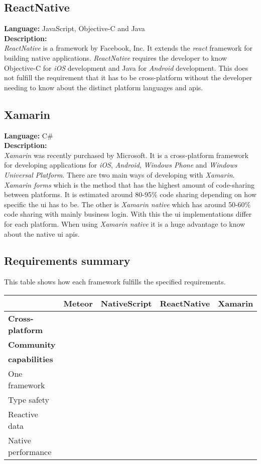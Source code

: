 \subsection*{ReactNative}
\textbf{Language:} JavaScript, Objective-C and Java
\\
\textbf{Description:}
\\
\textit{ReactNative} is a framework by Facebook, Inc.
It extends the \textit{\gls{react}} framework for building native applications. 
\textit{ReactNative} requires the developer to know Objective-C for \textit{iOS} development and Java for \textit{Android} development. 
This does not fulfill the requirement that it has to be cross-platform without the developer needing to know about the distinct platform languages and \glspl{api}.


\subsection*{Xamarin}
\textbf{Language:} C\#
\\
\textbf{Description:}
\\ 
\textit{Xamarin} was recently purchased by Microsoft. It is a cross-platform framework for developing applications for \textit{iOS}, \textit{Android}, \textit{Windows Phone} and \textit{Windows Universal Platform}. 
There are two main ways of developing with \textit{Xamarin}. 
\textit{Xamarin forms} which is the method that has the highest amount of code-sharing between platforms. 
It is estimated around 80-95\% code sharing depending on how specific the \gls{ui} has to be. 
The other is \textit{Xamarin native} which has around 50-60\% code sharing with mainly business login.
With this the \gls{ui} implementations differ for each platform. 
When using \textit{Xamarin native} it is a huge advantage to know about the native \gls{ui} \glspl{api}.

\subsection*{Requirements summary}
This table shows how each framework fulfills the specified requirements.

\begin{tabularx}{\textwidth}{|l|C C C C|}
	\hline 
	& Meteor & NativeScript & ReactNative & Xamarin \\ 
	\hline 
	\textbf{Cross-platform} & \cmark & \cmark & \cmark & \cmark \\ 
	\hline 
	\textbf{Community} & \cmark & \cmark & \cmark & \cmark \\ 
	\hline 
	\textbf{ capabilities} & \cmark & \cmark & \cmark & \cmark \\ 
	\hline 
	One framework & \cmark & \cmark & \xmark & \xmark \\ 
	\hline 
	Type safety & \xmark & \cmark & \xmark & \cmark \\ 
	\hline 
	Reactive data & \cmark & \xmark & \xmark & \xmark \\ 
	\hline 
	Native performance & \xmark & \cmark & \cmark & \cmark \\ 
	\hline 
\end{tabularx} 
	
